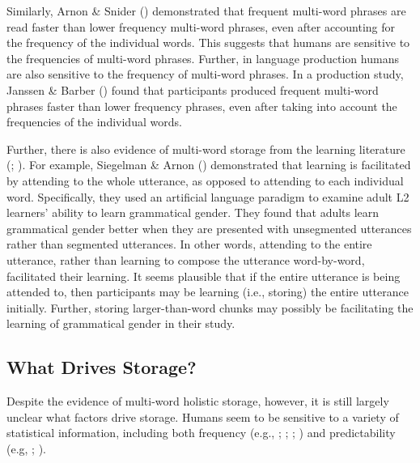 \documentclass[
  12pt,
  letterpaper,
]{scrreport}
\begin{document}
Similarly, Arnon \& Snider
() demonstrated that
frequent multi-word phrases are read faster than lower frequency
multi-word phrases, even after accounting for the frequency of the
individual words. This suggests that humans are sensitive to the
frequencies of multi-word phrases. Further, in language production
humans are also sensitive to the frequency of multi-word phrases. In a
production study, Janssen \& Barber
() found that
participants produced frequent multi-word phrases faster than lower
frequency phrases, even after taking into account the frequencies of the
individual words.

Further, there is also evidence of multi-word storage from the learning
literature (;
). For example, Siegelman \& Arnon
() demonstrated
that learning is facilitated by attending to the whole utterance, as
opposed to attending to each individual word. Specifically, they used an
artificial language paradigm to examine adult L2 learners' ability to
learn grammatical gender. They found that adults learn grammatical
gender better when they are presented with unsegmented utterances rather
than segmented utterances. In other words, attending to the entire
utterance, rather than learning to compose the utterance word-by-word,
facilitated their learning. It seems plausible that if the entire
utterance is being attended to, then participants may be learning (i.e.,
storing) the entire utterance initially. Further, storing
larger-than-word chunks may possibly be facilitating the learning of
grammatical gender in their study.

\subsection{What Drives Storage?}\label{what-drives-storage}

Despite the evidence of multi-word holistic storage, however, it is
still largely unclear what factors drive storage. Humans seem to be
sensitive to a variety of statistical information, including both
frequency (e.g., ;
;
; ) and predictability (e.g,
;
).
\end{document}
